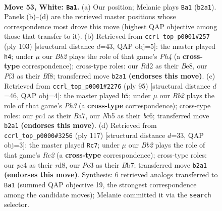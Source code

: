 \documentclass[11pt]{article}
\begin{document}
\clearpage

\begin{figure}[p]\centering
\begin{subfigure}{0.46\textwidth}\centering
\resizebox{\linewidth}{!}{%
\newchessgame
\chessboard[
  setfen={8/4p1k1/npr3pp/pN6/P1p2K2/2P2P2/1B1R4/8 w - - 0 53},
  showmover=false,
  pgfstyle=straightmove, color=movearrow, markmove={b2-a1}
]}
\caption{}
\end{subfigure}\hfill
\begin{subfigure}{0.46\textwidth}\centering
\resizebox{\linewidth}{!}{%
\newchessgame
\chessboard[
  setfen={4bbk1/8/R7/2p1ppPp/2P2n2/PK3P2/1P6/3R4 b - - 2 52},
  showmover=false,
  pgfstyle=straightmove, color=movearrow, markmove={h5-h4}
]}
\caption{}
\end{subfigure}
\\[4pt]
\begin{subfigure}{0.46\textwidth}\centering
\resizebox{\linewidth}{!}{%
\newchessgame
\chessboard[
  setfen={8/b1p2p2/2B2k1p/3P2p1/2r5/1N1n1PP1/P3R2P/1K6 b - - 0 48},
  showmover=false,
  pgfstyle=straightmove, color=movearrow, markmove={h6-h5}
]}
\caption{}
\end{subfigure}\hfill
\begin{subfigure}{0.46\textwidth}\centering
\resizebox{\linewidth}{!}{%
\newchessgame
\chessboard[
  setfen={3R4/1b2r3/p7/2P2nk1/RP4p1/2K4p/P4P1P/8 b - - 5 59},
  showmover=false,
  pgfstyle=straightmove, color=movearrow, markmove={e7-c7}
]}
\caption{}
\end{subfigure}
\caption{\textbf{Move 53, White: \texttt{Ba1}.} (a) Our position; Melanie plays \texttt{Ba1} (\texttt{b2a1}). Panels (b)--(d) are the retrieved master positions whose correspondence most drove this move (highest QAP objective among those that transfer to it). (b) Retrieved from \texttt{ccrl\_top\_p0001\#257} (ply 103) [structural distance $d$=43, QAP obj=5]: the master played \texttt{h4}; under $\mu$ our \emph{Bb2} plays the role of that game's \emph{Ph4} (a \textbf{cross-type} correspondence); cross-type roles: our \emph{R}d2 as their \emph{B}e8, our \emph{P}f3 as their \emph{B}f8; transferred move \texttt{b2a1} \textbf{(endorses this move)}. (c) Retrieved from \texttt{ccrl\_top\_p0001\#2276} (ply 95) [structural distance $d$=46, QAP obj=4]: the master played \texttt{h5}; under $\mu$ our \emph{Bb2} plays the role of that game's \emph{Ph3} (a \textbf{cross-type} correspondence); cross-type roles: our \emph{p}c4 as their \emph{B}a7, our \emph{N}b5 as their \emph{b}c6; transferred move \texttt{b2a1} \textbf{(endorses this move)}. (d) Retrieved from \texttt{ccrl\_top\_p0000\#3256} (ply 117) [structural distance $d$=33, QAP obj=3]: the master played \texttt{Rc7}; under $\mu$ our \emph{Bb2} plays the role of that game's \emph{Re2} (a \textbf{cross-type} correspondence); cross-type roles: our \emph{p}c4 as their \emph{r}d8, our \emph{P}c3 as their \emph{B}b7; transferred move \texttt{b2a1} \textbf{(endorses this move)}. Synthesis: 6 retrieved analogs transferred to \texttt{Ba1} (summed QAP objective 19, the strongest correspondence among the candidate moves); Melanie committed it via the \texttt{search} selector.}
\label{fig:thought-m104}
\end{figure}
\end{document}
